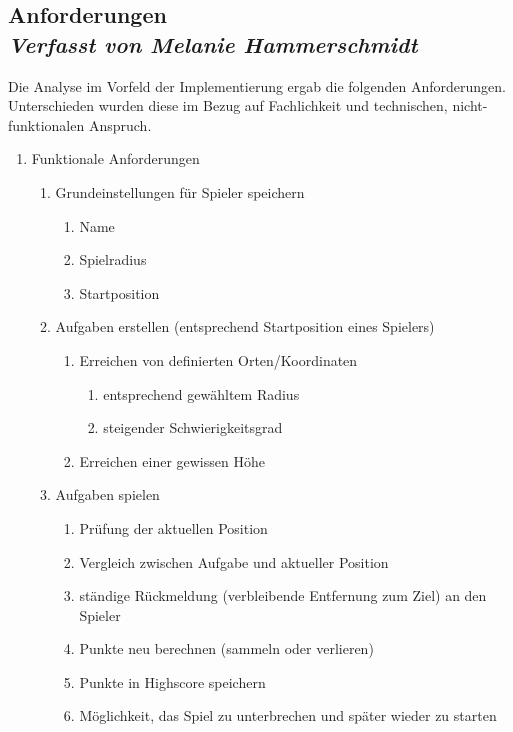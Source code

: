 \subsection[Anforderungen]{Anforderungen
 \\ \textnormal{\small{\textit {Verfasst von Melanie Hammerschmidt}}}}

Die Analyse im Vorfeld der Implementierung ergab die folgenden Anforderungen. Unterschieden wurden diese im Bezug auf Fachlichkeit und technischen, nicht-funktionalen Anspruch.

\newpage
\begin{enumerate}
\item Funktionale Anforderungen
	\begin{enumerate}
		\item Grundeinstellungen für Spieler speichern
		\begin{enumerate}
			\item Name
			\item Spielradius		
			\item Startposition
		\end{enumerate}
		\item Aufgaben erstellen (entsprechend Startposition eines Spielers)
		\begin{enumerate}
			\item Erreichen von definierten Orten/Koordinaten
			\begin{enumerate}
				\item entsprechend gewähltem Radius
				\item steigender Schwierigkeitsgrad
			\end{enumerate}
			\item Erreichen einer gewissen Höhe
		\end{enumerate}
		\item Aufgaben spielen
		\begin{enumerate}
			\item Prüfung der aktuellen Position 
			\item Vergleich zwischen Aufgabe und aktueller Position
			\item ständige Rückmeldung (verbleibende Entfernung zum Ziel) an den Spieler
			\item Punkte neu berechnen (sammeln oder verlieren)
			\item Punkte in Highscore speichern
			\item Möglichkeit, das Spiel zu unterbrechen und später wieder zu starten
		\end{enumerate}

\end{enumerate}
\end{enumerate}
